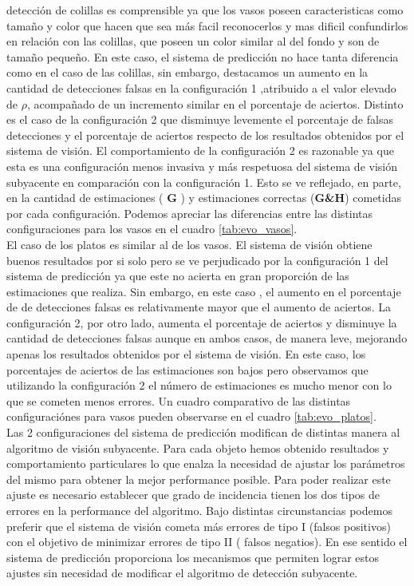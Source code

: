 detección de colillas es comprensible ya que los vasos poseen 
caracteristicas como tamaño y color que hacen que sea más facil 
reconocerlos y mas dificil confundirlos en relación con las 
colillas, que poseen un color similar al del fondo y son de tamaño 
pequeño. En este caso, el sistema de predicción no hace tanta 
diferencia como en el caso de las colillas, sin embargo, destacamos un 
aumento en la cantidad de detecciones falsas en la configuración 1 
,atribuido a el valor elevado de $\rho$, acompañado de un incremento 
similar en el porcentaje de aciertos. Distinto es el caso de 
la configuración 2 que disminuye levemente el porcentaje de falsas 
detecciones y el porcentaje de aciertos respecto de los resultados
obtenidos por el sistema de visión. El comportamiento de la 
configuración 2 es razonable ya que esta es una configuración menos 
invasiva y más respetuosa del sistema de visión subyacente en 
comparación con la configuración 1. Esto se ve reflejado, en parte, 
en la cantidad de estimaciones ( \textbf{G} ) y estimaciones correctas 
(\textbf{G\&H}) cometidas por cada configuración. Podemos 
apreciar las diferencias entre las distintas configuraciones para los 
vasos en el cuadro \ref{tab:evo_vasos}.\\
\indent El caso de los platos es similar al de los vasos. El sistema de visión 
obtiene buenos resultados por si solo pero se ve perjudicado por la configuración 1 del sistema de 
predicción ya que este no acierta en gran proporción de las estimaciones que realiza. 
Sin embargo, en este caso , el aumento en el porcentaje de de detecciones 
falsas es relativamente mayor que el aumento de aciertos. 
La configuración 2, por otro lado, aumenta el 
porcentaje de aciertos y disminuye la cantidad de detecciones falsas 
aunque en ambos casos, de manera leve, mejorando apenas los resultados 
obtenidos por el sistema de visión. En este caso, los porcentajes de 
aciertos de las estimaciones son bajos pero observamos que utilizando 
la configuración 2 el número de estimaciones es mucho menor con lo 
que se cometen menos errores. Un cuadro comparativo de las 
distintas configuraciónes para vasos pueden observarse en el cuadro 
\ref{tab:evo_platos}.\\
\indent  Las 2 configuraciones del sistema de predicción modifican de 
distintas manera al algoritmo de visión subyacente. Para cada objeto 
hemos obtenido resultados y comportamiento particulares lo que enalza 
la necesidad de ajustar los parámetros del mismo para obtener la mejor 
performance posible. Para poder realizar este ajuste es necesario 
establecer que grado de incidencia tienen los dos tipos de errores en la performance del
algoritmo. Bajo distintas circunstancias podemos preferir que el  
sistema de visión cometa más errores de tipo I (falsos positivos) con 
el objetivo de minimizar errores de tipo II ( falsos negatios). En ese 
sentido el sistema de predicción proporciona los mecanismos que 
permiten lograr estos ajustes sin necesidad de modificar el algoritmo de detección 
subyacente.
 

